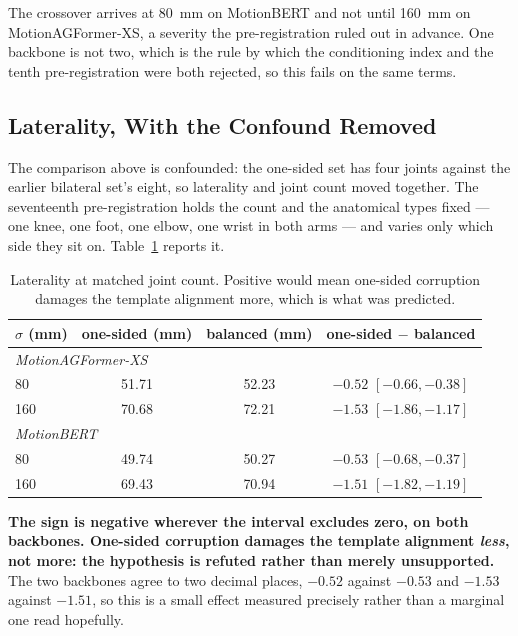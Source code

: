 \documentclass[12pt,a4paper]{report}
\begin{document}
\noindent The crossover arrives at 80~mm on MotionBERT and not until 160~mm on
MotionAGFormer-XS, a severity the pre-registration ruled out in advance. One
backbone is not two, which is the rule by which the conditioning index and the
tenth pre-registration were both rejected, so this fails on the same terms.

\subsection{Laterality, With the Confound Removed}

The comparison above is confounded: the one-sided set has four joints against the
earlier bilateral set's eight, so laterality and joint count moved together. The
seventeenth pre-registration holds the count and the anatomical types fixed --- one
knee, one foot, one elbow, one wrist in both arms --- and varies only which side
they sit on. Table~\ref{tab:laterality} reports it.

\begin{table}[H]
\centering
\small
\caption[Laterality at matched joint count]{Laterality at matched joint count. Positive would mean one-sided corruption damages the template alignment more, which is what was predicted.}
\label{tab:laterality}
\begin{tabular}{lccc}
\toprule
$\sigma$ (mm) & one-sided (mm) & balanced (mm) & one-sided $-$ balanced \\
\midrule
\multicolumn{4}{l}{\emph{MotionAGFormer-XS}} \\
80 & 51.71 & 52.23 & $-0.52$ \: $[-0.66, -0.38]$ \\
160 & 70.68 & 72.21 & $-1.53$ \: $[-1.86, -1.17]$ \\
\multicolumn{4}{l}{\emph{MotionBERT}} \\
80 & 49.74 & 50.27 & $-0.53$ \: $[-0.68, -0.37]$ \\
160 & 69.43 & 70.94 & $-1.51$ \: $[-1.82, -1.19]$ \\
\bottomrule
\end{tabular}
\end{table}

\noindent \textbf{The sign is negative wherever the interval excludes zero, on both
backbones. One-sided corruption damages the template alignment \emph{less}, not
more: the hypothesis is refuted rather than merely unsupported.} The two
backbones agree to two decimal places, $-0.52$ against $-0.53$ and $-1.53$
against $-1.51$, so this is a small effect measured precisely rather than a
marginal one read hopefully.
\end{document}
